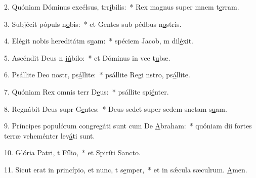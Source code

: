 2. Quóniam Dóminus excélsus, trr\uline{í}bilis:~* Rex magnus super mnem t\uline{e}rram.\par 
3. Subjécit pópuls n\uline{o}bis:~* et Gentes sub pédbus n\uline{o}stris.\par 
4. Elégit nobis hereditátm s\uline{u}am:~* spéciem Jacob, m dil\uline{é}xit.\par 
5. Ascéndit Deus n j\uline{ú}bilo:~* et Dóminus in vce t\uline{u}bæ.\par 
6. Psállite Deo nostr, ps\uline{á}llite:~* psállite Regi nstro, ps\uline{á}llite.\par 
7. Quóniam Rex omnis terr D\uline{e}us:~* psállite spi\uline{é}nter.\par 
8. Regnábit Deus supr G\uline{e}ntes:~* Deus sedet super sedem snctam s\uline{u}am.\par 
9. Príncipes populórum congregáti sunt cum De \uline{A}braham:~* quóniam dii fortes terræ veheménter lev\uline{á}ti sunt.\par 
10. Glória Patri, t F\uline{í}lio,~* et Spiríti S\uline{a}ncto.\par 
11. Sicut erat in princípio, et nunc, t s\uline{e}mper,~* et in sǽcula sæculrum. \uline{A}men.\par 

